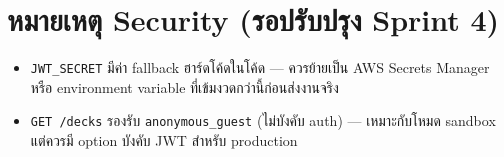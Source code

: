 \documentclass[12pt,a4paper]{article}
\begin{document}
\section{หมายเหตุ Security (รอปรับปรุง Sprint 4)}

\begin{itemize}[leftmargin=1.5em, itemsep=3pt]
  \item \texttt{JWT\_SECRET} มีค่า fallback ฮาร์ดโค้ดในโค้ด --- ควรย้ายเป็น AWS Secrets Manager หรือ environment variable ที่เข้มงวดกว่านี้ก่อนส่งงานจริง
  \item \texttt{GET /decks} รองรับ \texttt{anonymous\_guest} (ไม่บังคับ auth) --- เหมาะกับโหมด sandbox แต่ควรมี option บังคับ JWT สำหรับ production
\end{itemize}
\end{document}
